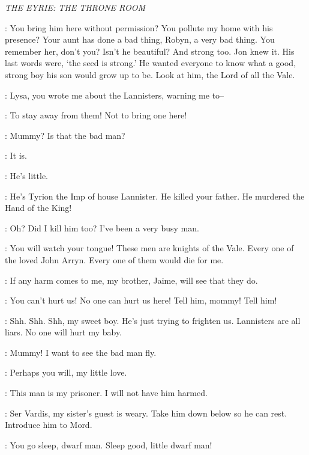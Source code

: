 \scene

\textit{THE EYRIE: THE THRONE ROOM} 


\LYSA: You bring him here without permission? You pollute my home with his presence?  Your aunt has done a bad thing, Robyn, a very bad thing. You remember her, don't you?  Isn't he beautiful? And strong too. Jon knew it. His last words were, `the seed is strong.' He wanted everyone to know what a good, strong boy his son would grow up to be. Look at him, the Lord of all the Vale. 

\CATELYN: Lysa, you wrote me about the Lannisters, warning me to--

\LYSA: To stay away from them! Not to bring one here! 

\ROBYN: Mummy? Is that the bad man? 

\LYSA: It is. 

\ROBYN: He's little. 

\LYSA: He's Tyrion the Imp of house Lannister. He killed your father. He murdered the Hand of the King! 

\TYRION: Oh? Did I kill him too? I've been a very busy man. 

\LYSA: You will watch your tongue! These men are knights of the Vale. Every one of the loved John Arryn. Every one of them would die for me. 

\TYRION: If any harm comes to me, my brother, Jaime, will see that they do. 

\ROBYN: You can't hurt us! No one can hurt us here! Tell him, mommy! Tell him! 

\LYSA: Shh. Shh. Shh, my sweet boy. He's just trying to frighten us. Lannisters are all liars. No one will hurt my baby. 

\ROBYN: Mummy! I want to see the bad man fly. 

\LYSA: Perhaps you will, my little love. 

\CATELYN: This man is my prisoner. I will not have him harmed. 

\LYSA: Ser Vardis, my sister's guest is weary. Take him down below so he can rest. Introduce him to Mord. 


\MORD: You go sleep, dwarf man. Sleep good, little dwarf man! 

